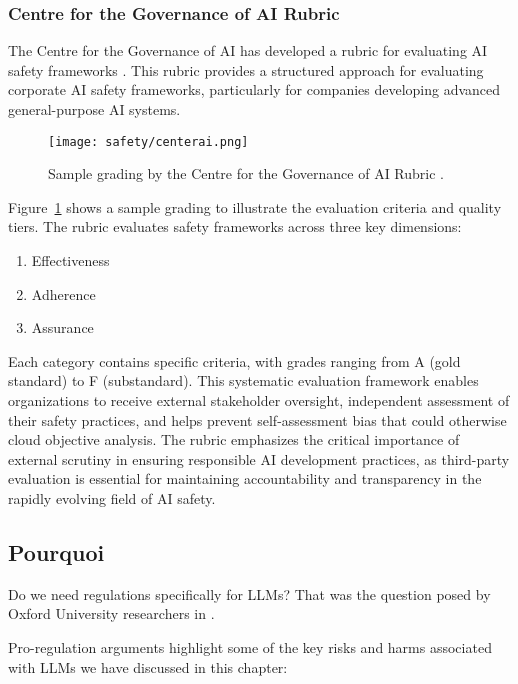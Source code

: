 \subsubsection{Centre for the Governance of AI Rubric}

The Centre for the Governance of AI has developed a rubric for evaluating AI safety frameworks . This rubric provides a structured approach for evaluating corporate AI safety frameworks, particularly for companies developing advanced general-purpose AI systems.

\begin{figure}[H]
\centering
\texttt{[image: safety/centerai.png]}
\caption{Sample grading by the Centre for the Governance of AI Rubric \cite{alaga2024gradingrubricaisafety}.}
\label{centerai}
\end{figure}

Figure~\ref{centerai} shows a sample grading to illustrate the evaluation criteria and quality tiers. The rubric evaluates safety frameworks across three key dimensions:

\begin{enumerate}
    \item Effectiveness
    \item Adherence
    \item Assurance
\end{enumerate}

Each category contains specific criteria, with grades ranging from A (gold standard) to F (substandard). This systematic evaluation framework enables organizations to receive external stakeholder oversight, independent assessment of their safety practices, and helps prevent self-assessment bias that could otherwise cloud objective analysis. The rubric emphasizes the critical importance of external scrutiny in ensuring responsible AI development practices, as third-party evaluation is essential for maintaining accountability and transparency in the rapidly evolving field of AI safety.
\subsection{Pourquoi}

Do we need regulations specifically for LLMs? That was the question posed by Oxford University researchers in .

Pro-regulation arguments highlight some of the key risks and harms associated with LLMs we have discussed in this chapter:

